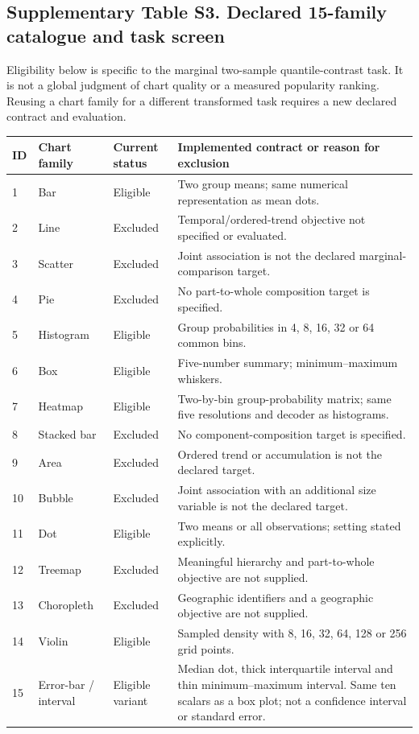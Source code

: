 \documentclass[10pt]{article}
\begin{document}
\subsection*{Supplementary Table S3. Declared 15-family catalogue and task screen}
Eligibility below is specific to the marginal two-sample quantile-contrast task. It is not a global judgment of chart quality or a measured popularity ranking. Reusing a chart family for a different transformed task requires a new declared contract and evaluation.
\begingroup\small
\begin{longtable}{p{.55cm}p{2.4cm}p{2.0cm}p{9.4cm}}\toprule
ID & Chart family & Current status & Implemented contract or reason for exclusion\\\midrule
1 & Bar & Eligible & Two group means; same numerical representation as mean dots.\\
2 & Line & Excluded & Temporal/ordered-trend objective not specified or evaluated.\\
3 & Scatter & Excluded & Joint association is not the declared marginal-comparison target.\\
4 & Pie & Excluded & No part-to-whole composition target is specified.\\
5 & Histogram & Eligible & Group probabilities in 4, 8, 16, 32 or 64 common bins.\\
6 & Box & Eligible & Five-number summary; minimum--maximum whiskers.\\
7 & Heatmap & Eligible & Two-by-bin group-probability matrix; same five resolutions and decoder as histograms.\\
8 & Stacked bar & Excluded & No component-composition target is specified.\\
9 & Area & Excluded & Ordered trend or accumulation is not the declared target.\\
10 & Bubble & Excluded & Joint association with an additional size variable is not the declared target.\\
11 & Dot & Eligible & Two means or all observations; setting stated explicitly.\\
12 & Treemap & Excluded & Meaningful hierarchy and part-to-whole objective are not supplied.\\
13 & Choropleth & Excluded & Geographic identifiers and a geographic objective are not supplied.\\
14 & Violin & Eligible & Sampled density with 8, 16, 32, 64, 128 or 256 grid points.\\
15 & Error-bar / interval & Eligible variant & Median dot, thick interquartile interval and thin minimum--maximum interval. Same ten scalars as a box plot; not a confidence interval or standard error.\\\bottomrule
\end{longtable}\endgroup
\end{document}

